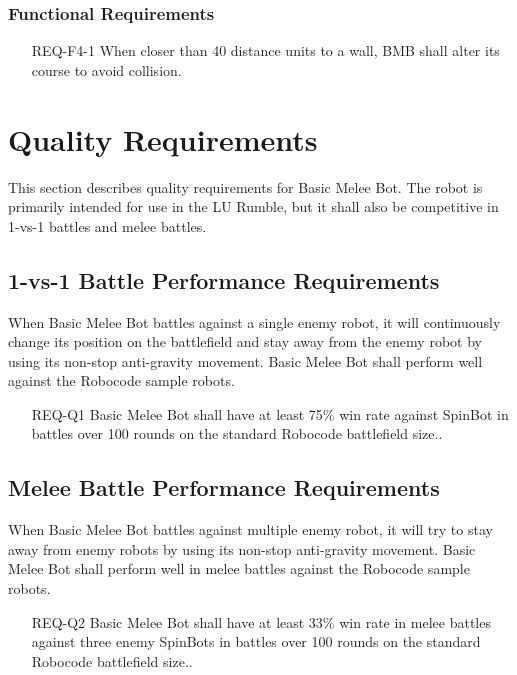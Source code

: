 \documentclass{scrreprt}
\begin{document}
\subsection{Functional Requirements}
\begin{itemize}
\item[REQ-F4-1] When closer than 40 distance units to a wall, BMB shall alter its course to avoid collision.
\end{itemize}

\chapter{Quality Requirements}
This section describes quality requirements for Basic Melee Bot. The robot is primarily intended for use in the LU Rumble, but it shall also be competitive in 1-vs-1 battles and melee battles.

\section{1-vs-1 Battle Performance Requirements}
When Basic Melee Bot battles against a single enemy robot, it will continuously change its position on the battlefield and stay away from the enemy robot by using its non-stop anti-gravity movement. Basic Melee Bot shall perform well against the Robocode sample robots.

\begin{itemize}
\item[REQ-Q1] Basic Melee Bot shall have at least 75\% win rate against SpinBot in battles over 100 rounds on the standard Robocode battlefield size..
\end{itemize}

\section{Melee Battle Performance Requirements}
When Basic Melee Bot battles against multiple enemy robot, it will try to stay away from enemy robots by using its non-stop anti-gravity movement. Basic Melee Bot shall perform well in melee battles against the Robocode sample robots.

\begin{itemize}
\item[REQ-Q2] Basic Melee Bot shall have at least 33\% win rate in melee battles against three enemy SpinBots in battles over 100 rounds on the standard Robocode battlefield size..
\end{itemize}
\end{document}
